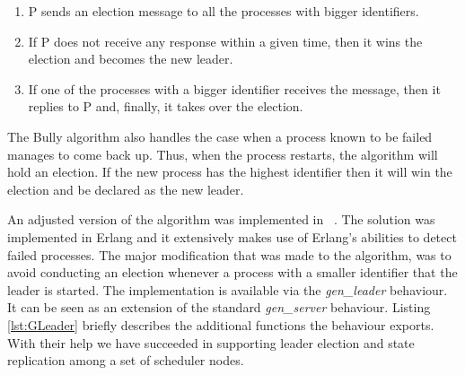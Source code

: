 \documentclass[11pt,a4paper,twoside]{report}
\begin{document}
\begin{enumerate}
\item{}
P sends an election message to all the processes with bigger identifiers.
\item{}
If P does not receive any response within a given time, then it wins the election and becomes the new leader.
\item{}
If one of the processes with a bigger identifier receives the message, then it replies to P and, finally, it takes over the election.
\end{enumerate}


The Bully algorithm also handles the case when a process known to be failed manages to come back up. Thus, when the process restarts, the algorithm will hold an election. If the new process has the highest identifier then it will win the election and be declared as the new leader.


An adjusted version of the algorithm was implemented in ~\cite{GenLeader}. The solution was implemented in Erlang and it extensively makes use of Erlang's abilities to detect failed processes. The major modification that was made to the algorithm, was to avoid conducting an election whenever a process with a smaller identifier that the leader is started. The implementation is available via the \textit{gen\_leader} behaviour. It can be seen as an extension of the standard \textit{gen\_server} behaviour. Listing \ref{lst:GLeader} briefly describes the additional functions the behaviour exports. With their help we have succeeded in supporting leader election and state replication among a set of scheduler nodes.
\end{document}

